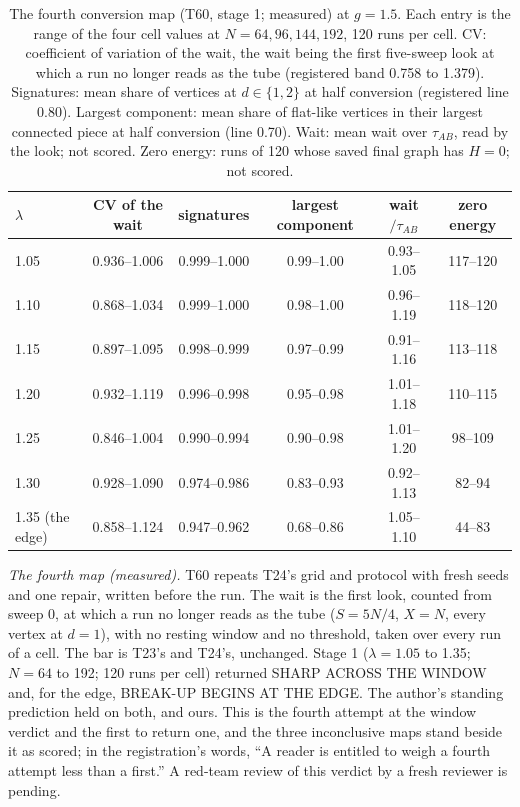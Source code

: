 \documentclass[aps,pre,10pt,twocolumn,superscriptaddress,nofootinbib]{revtex4-2}
\begin{document}
\begin{table}[t]
\caption{The fourth conversion map (T60, stage 1; measured) at $g=1.5$. Each entry is the range of the four cell
values at $N=64,96,144,192$, 120 runs per cell. CV: coefficient of variation of the wait, the wait being the
first five-sweep look at which a run no longer reads as the tube (registered band 0.758 to 1.379). Signatures:
mean share of vertices at $d\in\{1,2\}$ at half conversion (registered line 0.80). Largest component: mean share
of flat-like vertices in their largest connected piece at half conversion (line 0.70). Wait: mean wait over
$\tau_{AB}$, read by the look; not scored. Zero energy: runs of 120 whose saved final graph has $H=0$; not
scored.}
\label{tab:t60}
\begin{ruledtabular}
\begin{tabular}{lccccc}
$\lambda$ & CV of the wait & signatures & largest component & wait$/\tau_{AB}$ & zero energy \\
\hline
1.05 & 0.936--1.006 & 0.999--1.000 & 0.99--1.00 & 0.93--1.05 & 117--120 \\
1.10 & 0.868--1.034 & 0.999--1.000 & 0.98--1.00 & 0.96--1.19 & 118--120 \\
1.15 & 0.897--1.095 & 0.998--0.999 & 0.97--0.99 & 0.91--1.16 & 113--118 \\
1.20 & 0.932--1.119 & 0.996--0.998 & 0.95--0.98 & 1.01--1.18 & 110--115 \\
1.25 & 0.846--1.004 & 0.990--0.994 & 0.90--0.98 & 1.01--1.20 & 98--109 \\
1.30 & 0.928--1.090 & 0.974--0.986 & 0.83--0.93 & 0.92--1.13 & 82--94 \\
1.35 (the edge) & 0.858--1.124 & 0.947--0.962 & 0.68--0.86 & 1.05--1.10 & 44--83 \\
\end{tabular}
\end{ruledtabular}
\end{table}

\emph{The fourth map (measured).} T60 repeats T24's grid and protocol with fresh seeds and one repair, written
before the run. The wait is the first look, counted from sweep 0, at which a run no longer reads as the tube
($S=5N/4$, $X=N$, every vertex at $d=1$), with no resting window and no threshold, taken over every run of a
cell. The bar is T23's and T24's, unchanged. Stage 1 ($\lambda=1.05$ to 1.35; $N=64$ to 192; 120 runs per cell)
returned SHARP ACROSS THE WINDOW and, for the edge, BREAK-UP BEGINS AT THE EDGE. The author's standing prediction held on both,
and ours. This is the fourth attempt at the window verdict and the first to return one, and the three
inconclusive maps stand beside it as scored; in the registration's words, ``A reader is entitled to weigh a
fourth attempt less than a first.'' A red-team review of this verdict by a fresh reviewer is pending.
\end{document}
